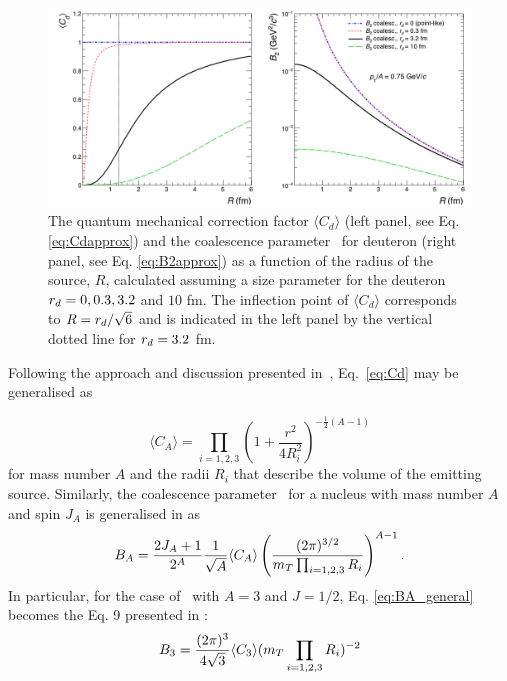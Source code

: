 \documentclass[a4paper,11pt]{scrartcl}
\begin{document}
\begin{figure}[ht]
\begin{center}
\includegraphics[width=.9\textwidth]{theory_coalescence_Cd_B2.png}
\caption{{The quantum mechanical correction factor $\langle C_{d} \rangle$ (left panel, see Eq. \ref{eq:Cdapprox}) and the coalescence parameter \btwo~for deuteron (right panel, see Eq. \ref{eq:B2approx}) as a function of the radius of the source, $R$, calculated assuming a size parameter for the deuteron $r_{d} = 0, 0.3, 3.2$ and $10$ fm. The inflection point of $\langle C_{d} \rangle$ corresponds to $R = r_{d}/\sqrt{6}$ and is indicated in the left panel by the vertical dotted line for $r_{d} = 3.2$ fm.}}
\label{fig:radiusDependence}
\end{center}
\end{figure}

Following the approach and discussion presented in~\cite{Blum:2017qnn}, Eq.~\ref{eq:Cd} may be generalised as 

\begin{equation}
\langle C_{A} \rangle = \prod_{i=1,2,3} \left(1 + \frac{r^2}{4R_{i}^2} \right)^{-\frac{1}{2}(A-1)}
\label{eq:CA_general}
\end{equation}
%
for mass number $A$ and the radii $R_{i}$ that describe the volume of the emitting source.
Similarly, the coalescence parameter \bA~for a nucleus with mass number $A$ and spin $J_{A}$ is generalised in \cite{Scheibl:1998tk} as
\begin{equation}
B_{A} = \frac{2J_{A} +1}{2^{A}}\frac{1}{\sqrt{A}}  \langle C_{A} \rangle \left( \frac{(2\pi)^{3/2}} {m_{T}\prod_{i=1,2,3} R_{i}} \right)^{A-1}.
\label{eq:BA_general}
\end{equation}
In particular, for the case of \hethree~with $A=3$ and $J=1/2$, Eq. \ref{eq:BA_general} becomes the Eq. 9 presented in \cite{Blum:2017qnn}:
\begin{equation}
B_{3} = \frac{(2\pi)^{3}}{4\sqrt{3}} \langle C_{3} \rangle (m_{T}\prod_{i=1,2,3} R_{i})^{-2}
\label{eq:B3}
\end{equation}
 
\end{document}
